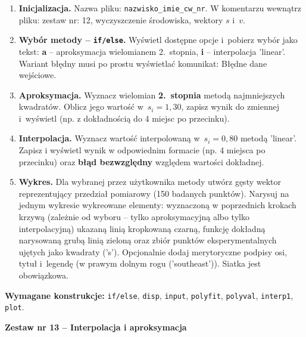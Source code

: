 \documentclass[a4paper,11pt]{article}
\begin{document}
\begin{enumerate}[leftmargin=*, label=\textbf{\arabic*.}, itemsep=2pt]

  \item \textbf{Inicjalizacja.}
    Nazwa pliku: \texttt{nazwisko\_imie\_cw\_nr}. W komentarzu wewnątrz pliku: zestaw nr: 12, wyczyszczenie środowiska, wektory $s$ i~$v$.

  \item \textbf{Wybór metody -- \texttt{if/else}.}
    Wyświetl dostępne opcje i~pobierz wybór jako tekst: \textbf{a} -- aproksymacja wielomianem 2.~stopnia, \textbf{i} -- interpolacja 'linear'. Wariant błędny musi po prostu wyświetlać komunikat: Błędne dane wejściowe.

  \item \textbf{Aproksymacja.}
    Wyznacz wielomian \textbf{2.~stopnia} metodą najmniejszych kwadratów. Oblicz jego wartość w~$s_i = 1{,}30$, zapisz wynik do zmiennej i~wyświetl (np. z dokładnością do 4 miejsc po przecinku).

  \item \textbf{Interpolacja.}
    Wyznacz wartość interpolowaną w~$s_i = 0{,}80$ metodą 'linear'. Zapisz i wyświetl wynik w odpowiednim formacie (np. 4 miejsca po przecinku) oraz \textbf{błąd bezwzględny} względem wartości dokładnej.

  \item \textbf{Wykres.}
    Dla wybranej przez użytkownika metody utwórz gęsty wektor reprezentujący przedział pomiarowy (150 badanych punktów). Narysuj na jednym wykresie wykreowane elementy: wyznaczoną w poprzednich krokach krzywą (zależnie od wyboru -- tylko aproksymacyjną albo tylko interpolacyjną) ukazaną linią kropkowaną czarną, funkcję dokładną narysowaną grubą linią zieloną oraz zbiór punktów eksperymentalnych ujętych jako kwadraty ('s'). Opcjonalnie dodaj merytoryczne podpisy osi, tytuł i~legendę (w prawym dolnym rogu ('southeast')). Siatka jest obowiązkowa.

\end{enumerate}

\vspace{0.3cm}
\begin{ramka}
\textbf{Wymagane konstrukcje:}
\texttt{if/else}, \texttt{disp}, \texttt{input}, \texttt{polyfit}, \texttt{polyval}, \texttt{interp1}, \texttt{plot}.
\end{ramka}

\clearpage
\begin{center}
  {\large\bfseries Zestaw nr 13 \quad -- \quad Interpolacja i aproksymacja}
\end{center}
\hrulefill
\vspace{0.4cm}
\end{document}
